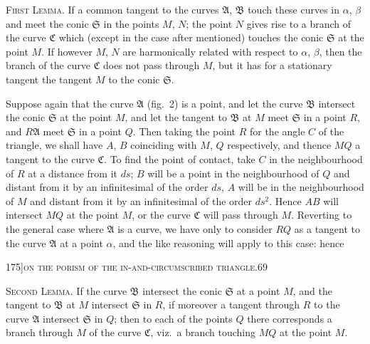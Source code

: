 \documentclass[11pt]{article}
\begin{document}
\textsc{First Lemma.} If a common tangent to the curves $\mathfrak{A}$, $\mathfrak{B}$ touch these curves in
$\alpha$, $\beta$ and meet the conic $\mathfrak{S}$ in the points $M$, $N$; the point $N$ gives rise to a branch
of the curve $\mathfrak{C}$ which (except in the case after mentioned) touches the conic $\mathfrak{S}$ at
the point $M$. If however $M$, $N$ are harmonically related with respect to $\alpha$, $\beta$, then
the branch of the curve $\mathfrak{C}$ does not pass through $M$, but it has for a stationary
tangent the tangent $M$ to the conic $\mathfrak{S}$.

Suppose again that the curve $\mathfrak{A}$ (fig.~2) is a point, and let the curve $\mathfrak{B}$ intersect
the conic $\mathfrak{S}$ at the point $M$, and let the tangent to $\mathfrak{B}$ at $M$ meet $\mathfrak{S}$ in a point $R$,
and $R\mathfrak{A}$ meet $\mathfrak{S}$ in a point $Q$. Then taking the point $R$ for the angle $C$ of the
triangle, we shall have $A$, $B$ coinciding with $M$, $Q$ respectively, and thence $MQ$ a
tangent to the curve $\mathfrak{C}$. To find the point of contact, take $C$ in the neighbourhood
of $R$ at a distance from it $ds$; $B$ will be a point in the neighbourhood of $Q$ and
distant from it by an infinitesimal of the order $ds$, $A$ will be in the neighbourhood
of $M$ and distant from it by an infinitesimal of the order $ds^{2}$. Hence $AB$ will
intersect $MQ$ at the point $M$, or the curve $\mathfrak{C}$ will pass through $M$. Reverting to the
general case where $\mathfrak{A}$ is a curve, we have only to consider $RQ$ as a tangent to the
curve $\mathfrak{A}$ at a point $\alpha$, and the like reasoning will apply to this case: hence

\newpage

\begin{center}
\small 175]\hfill\textsc{on the porism of the in-and-circumscribed triangle.}\hfill\textsc{69}
\end{center}

\medskip

\textsc{Second Lemma.} If the curve $\mathfrak{B}$ intersect the conic $\mathfrak{S}$ at a point $M$, and the
tangent to $\mathfrak{B}$ at $M$ intersect $\mathfrak{S}$ in $R$, if moreover a tangent through $R$ to the
curve $\mathfrak{A}$ intersect $\mathfrak{S}$ in $Q$; then to each of the points $Q$ there corresponds a branch
through $M$ of the curve $\mathfrak{C}$, viz.\ a branch touching $MQ$ at the point $M$.
\end{document}
